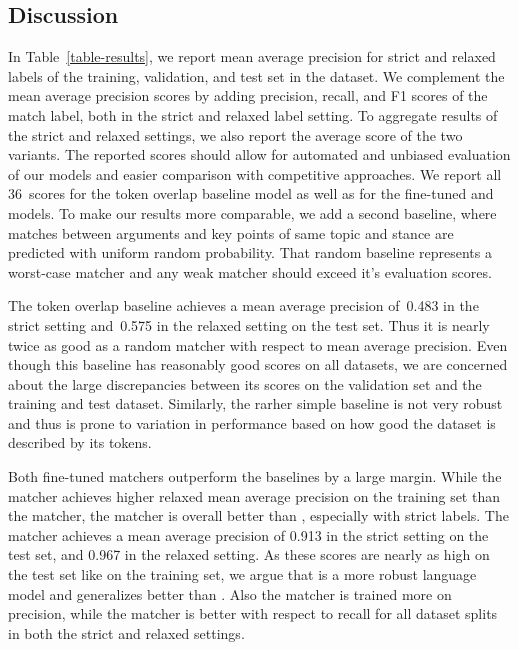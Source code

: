 \subsection{Discussion}
In Table~\ref{table-results}, we report mean average precision for strict and relaxed labels of the training, validation, and test set in the \ArgKP dataset.
We complement the mean average precision scores by adding precision, recall, and F1 scores of the match label, both in the strict and relaxed label setting.
To aggregate results of the strict and relaxed settings, we also report the average score of the two variants.
The reported scores should allow for automated and unbiased evaluation of our models and easier comparison with competitive approaches.
We report all 36~scores for the token overlap baseline model as well as for the fine-tuned \BertBase and \RobertaBase models.
To make our results more comparable, we add a second baseline, where matches between arguments and key points of same topic and stance are predicted with uniform random probability.
That random baseline represents a worst-case matcher and any weak matcher should exceed it's evaluation scores.

The token overlap baseline achieves a mean average precision of~0.483 in the strict setting and~0.575 in the relaxed setting on the test set.
Thus it is nearly twice as good as a random matcher with respect to mean average precision.
Even though this baseline has reasonably good scores on all datasets, we are concerned about the large discrepancies between its scores on the validation set and the training and test dataset.
Similarly, the rarher simple baseline is not very robust and thus is prone to variation in performance based on how good the dataset is described by its tokens.

Both fine-tuned matchers outperform the baselines by a large margin.
While the \BertBase matcher achieves higher relaxed mean average precision on the training set than the \RobertaBase matcher, the \RobertaBase matcher is overall better than \Bert, especially with strict labels.
The \RobertaBase matcher achieves a mean average precision of 0.913 in the strict setting on the test set, and 0.967 in the relaxed setting.
As these scores are nearly as high on the test set like on the training set, we argue that \Roberta is a more robust language model and generalizes better than \Bert.
Also the \RobertaBase matcher is trained more on precision, while the \BertBase matcher is better with respect to recall for all dataset splits in both the strict and relaxed settings.
